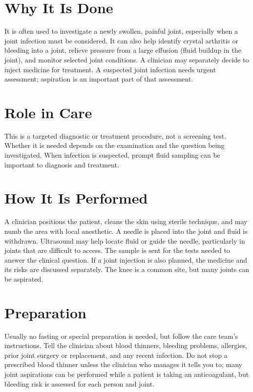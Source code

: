 \section*{Why It Is Done}
It is often used to investigate a newly swollen, painful joint, especially when a joint infection must be considered. It can also help identify crystal arthritis or bleeding into a joint, relieve pressure from a large effusion (fluid buildup in the joint), and monitor selected joint conditions. A clinician may separately decide to inject medicine for treatment. A suspected joint infection needs urgent assessment; aspiration is an important part of that assessment.

\section*{Role in Care}
This is a targeted diagnostic or treatment procedure, not a screening test. Whether it is needed depends on the examination and the question being investigated. When infection is suspected, prompt fluid sampling can be important to diagnosis and treatment.

\section*{How It Is Performed}
A clinician positions the patient, cleans the skin using sterile technique, and may numb the area with local anesthetic. A needle is placed into the joint and fluid is withdrawn. Ultrasound may help locate fluid or guide the needle, particularly in joints that are difficult to access. The sample is sent for the tests needed to answer the clinical question. If a joint injection is also planned, the medicine and its risks are discussed separately. The knee is a common site, but many joints can be aspirated.

\section*{Preparation}
Usually no fasting or special preparation is needed, but follow the care team's instructions. Tell the clinician about blood thinners, bleeding problems, allergies, prior joint surgery or replacement, and any recent infection. Do not stop a prescribed blood thinner unless the clinician who manages it tells you to; many joint aspirations can be performed while a patient is taking an anticoagulant, but bleeding risk is assessed for each person and joint.

